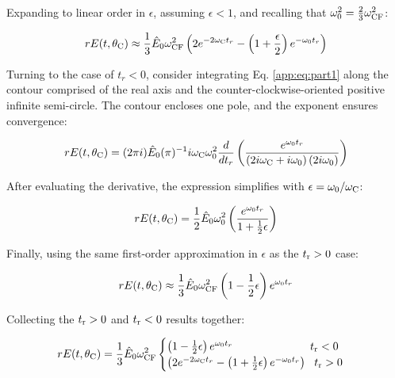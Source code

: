 \documentclass[amsmath,amssymb,aps,prd,10pt,twocolumn]{revtex4}
\begin{document}
Expanding to linear order in $\epsilon$, assuming $\epsilon < 1$, and recalling that $\omega_{\rm 0}^2 = \frac{2}{3}\omega_{\rm CF}^2$:

\begin{equation}
r E(t,\theta_{\rm C}) \approx \frac{1}{3} \hat{E}_0 \omega_{\rm CF}^2 \left( 2 e^{-2\omega_{\rm C} t_r} - \left(1+\frac{\epsilon}{2} \right) e^{-\omega_{\rm 0}t_r} \right)
\end{equation}

Turning to the case of $t_r < 0$, consider integrating Eq. \ref{app:eq:part1} along the contour comprised of the real axis and the counter-clockwise-oriented positive infinite semi-circle.  The contour encloses one pole, and the exponent ensures convergence:

\begin{equation}
r E(t,\theta_{\rm C}) = (2\pi i)\hat{E}_0 (\pi)^{-1} i \omega_{\rm C} \omega_{\rm 0}^2 \frac{d}{dt_r}\left( \frac{ e^{\omega_{\rm 0} t_r}}{ \left(2 i \omega_{\rm C} + i\omega_{\rm 0} \right) (2i\omega_{\rm 0}) } \right)
\end{equation}

After evaluating the derivative, the expression simplifies with $\epsilon = \omega_0/\omega_{\rm C}$:

\begin{equation}
r E(t,\theta_{\rm C}) = \frac{1}{2} \hat{E}_0 \omega_{\rm 0}^2  \left( \frac{ e^{\omega_{\rm 0} t_r} }{1 + \frac{1}{2}\epsilon } \right) \label{app:eq:yes_eps2}
\end{equation}

Finally, using the same first-order approximation in $\epsilon$ as the $t_{\rm r} > 0$ case:

\begin{equation}
r E(t,\theta_{\rm C}) \approx \frac{1}{3} \hat{E}_0 \omega_{\rm CF}^2  \left(1 - \frac{1}{2}\epsilon \right)e^{\omega_{\rm 0} t_r}
\end{equation}

Collecting the $t_{\rm r} > 0$ and $t_{\rm r} < 0$ results together:

\begin{widetext}
\begin{equation}
r E(t,\theta_{\rm C}) = \frac{1}{3} \hat{E}_0 \omega_{\rm CF}^2
\begin{cases}
\left(1 - \frac{1}{2}\epsilon \right)e^{\omega_{\rm 0} t_r} ~~~~~~~~~~~~~~~~~~~~~ t_{\rm r} < 0 \\
\left( 2 e^{-2\omega_{\rm C} t_r} - \left(1+\frac{1}{2}\epsilon \right) e^{-\omega_{\rm 0}t_r} \right) ~~ t_{\rm r} > 0
\end{cases}
\label{app:eq:on_cone}
\end{equation}
\end{widetext}
\end{document}
